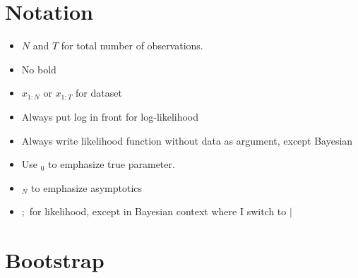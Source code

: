 \documentclass[12pt]{article}
\theoremstyle{plain}
\theoremstyle{definition}
\theoremstyle{remark}
\begin{document}
\clearpage
\section{Notation}

\begin{itemize}
  \item $N$ and $T$ for total number of observations.
  \item No bold
  \item $x_{1:N}$ or $x_{1:T}$ for dataset
  \item Always put log in front for log-likelihood
  \item Always write likelihood function without data as argument,
    except Bayesian
  \item Use ${}_0$ to emphasize true parameter.
  \item ${}_N$ to emphasize asymptotics
  \item $;$ for likelihood, except in Bayesian context where I switch to
    $|$
\end{itemize}


\clearpage
\section{Bootstrap}
\end{document}
